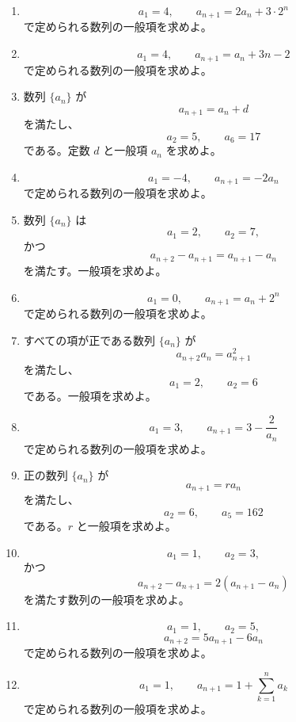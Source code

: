 \begin{enumerate}[label=\textbf{問\arabic*.},leftmargin=3.8em,format=\bookitemlink{practice-basic}{problem}{answer}]
              である。\(p,q\) と一般項 \(a_n\) を求めよ。
        \item \[
            a_1=4,\qquad
            a_{n+1}=2a_n+3\cdot2^n
          \]
              で定められる数列の一般項を求めよ。
        \item \[
            a_1=4,\qquad a_{n+1}=a_n+3n-2
          \]
              で定められる数列の一般項を求めよ。
        \item 数列 \(\{a_n\}\) が
          \[
            a_{n+1}=a_n+d
          \]
              を満たし、
          \[
            a_2=5,\qquad a_6=17
          \]
              である。定数 \(d\) と一般項 \(a_n\) を求めよ。
        \item \[
            a_1=-4,\qquad a_{n+1}=-2a_n
          \]
              で定められる数列の一般項を求めよ。
        \item 数列 \(\{a_n\}\) は
          \[
            a_1=2,\qquad a_2=7,
          \]
              かつ
          \[
            a_{n+2}-a_{n+1}=a_{n+1}-a_n
          \]
              を満たす。一般項を求めよ。
        \item \[
            a_1=0,\qquad a_{n+1}=a_n+2^n
          \]
              で定められる数列の一般項を求めよ。
        \item すべての項が正である数列 \(\{a_n\}\) が
          \[
            a_{n+2}a_n=a_{n+1}^2
          \]
              を満たし、
          \[
            a_1=2,\qquad a_2=6
          \]
              である。一般項を求めよ。
        \item \[
            a_1=3,\qquad
            a_{n+1}=3-\frac2{a_n}
          \]
              で定められる数列の一般項を求めよ。
        \item 正の数列 \(\{a_n\}\) が
          \[
            a_{n+1}=ra_n
          \]
              を満たし、
          \[
            a_2=6,\qquad a_5=162
          \]
              である。\(r\) と一般項を求めよ。
        \item \[
            a_1=1,\qquad a_2=3,
          \]
              かつ
          \[
            a_{n+2}-a_{n+1}
            =2(a_{n+1}-a_n)
          \]
              を満たす数列の一般項を求めよ。
        \item \[
            a_1=1,\qquad a_2=5,
          \]
          \[
            a_{n+2}=5a_{n+1}-6a_n
          \]
              で定められる数列の一般項を求めよ。
        \item \[
            a_1=1,\qquad
            a_{n+1}=1+\sum_{k=1}^{n}a_k
          \]
              で定められる数列の一般項を求めよ。

\end{enumerate}
